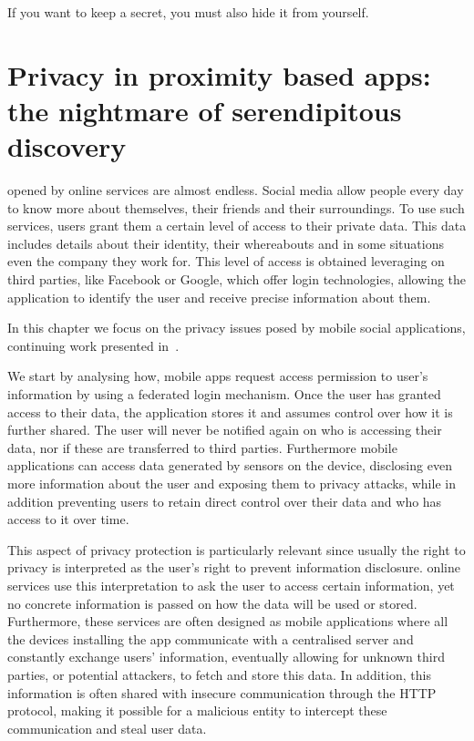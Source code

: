 \begin{savequote}[75mm]
If you want to keep a secret, you must also hide it from yourself.
\end{savequote}

\chapter{Privacy in proximity based apps: the nightmare of serendipitous discovery}

 opened by online services are almost endless. Social media allow people every day to know more about themselves, their friends and their surroundings. To use such services, users grant them a certain level of access to their private data. This data includes details about their identity, their whereabouts and in some situations even the company they work for. This level of access is obtained leveraging on third parties, like Facebook or Google, which offer login technologies, allowing the application to identify the user and receive precise information about them.

In this chapter we focus on the privacy issues posed by mobile social applications, continuing work presented in~\cite{puglisi2015potential, puglisi2016mobilitapp}.

We start by analysing how, mobile apps request access permission to user's information by using a federated login mechanism. Once the user has granted access to their data, the application stores it and assumes control over how it is further shared. The user will never be notified again on who is accessing their data, nor if these are transferred to third parties. Furthermore mobile applications can access data generated by sensors on the device, disclosing even more information about the user and exposing them to privacy attacks, while in addition preventing users to retain direct control over their data and who has access to it over time.

This aspect of privacy protection is particularly relevant since usually the right to privacy is interpreted as the user's right to prevent information disclosure. online services use this interpretation to ask the user to access certain information, yet no concrete information is passed on how the data will be used or stored. Furthermore, these services are often designed as mobile applications where all the devices installing the app communicate with a centralised server and constantly exchange users' information, eventually allowing for unknown third parties, or potential attackers, to fetch and store this data. In addition, this information is often shared with insecure communication through the HTTP protocol, making it possible for a malicious entity to intercept these communication and steal user data.

